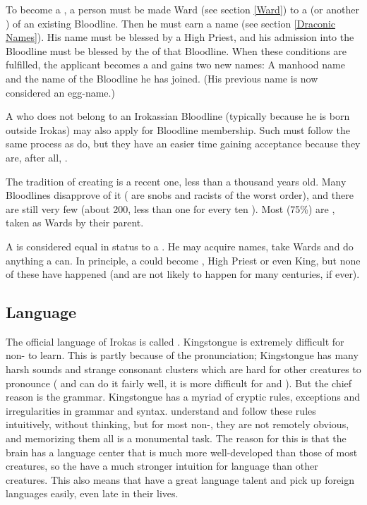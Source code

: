 To become a \dragonbrother{}, a person must be made Ward (see section \ref{Ward}) to a \dragon{} (or another \dragonbrother{}) of an existing Bloodline. Then he must earn a name (see section \ref{Draconic Names}). His name must be blessed by a High Priest, and his admission into the Bloodline must be blessed by the \dragonlord{} of that Bloodline. When these conditions are fulfilled, the applicant becomes a \dragonbrother{} and gains two new names: A manhood name and the name of the Bloodline he has joined. (His previous name is now considered an egg-name.) 

A \dragon{} who does not belong to an Irokassian Bloodline (typically because he is born outside Irokas) may also apply for Bloodline membership. Such \dragons{} must follow the same process as \dragonbrothers{} do, but they have an easier time gaining acceptance because they are, after all, \dragons{}. 

The tradition of creating \dragonbrothers{} is a recent one, less than a thousand years old. Many Bloodlines disapprove of it (\dragons{} are snobs and racists of the worst order), and there are still very few \dragonbrothers{} (about 200, less than one for every ten \dragons{}). Most \dragonbrothers{} (75\%) are \rachyth, taken as Wards by their \draconic{} parent. 

A \dragonbrother{} is considered equal in status to a \dragon{}. He may acquire names, take Wards and do anything a \dragon{} can. In principle, a \dragonbrother{} could become \dragonlord{}, High Priest or even King, but none of these have happened (and are not likely to happen for many centuries, if ever). 



\subsection{Language}
The official language of Irokas is called . Kingstongue is extremely difficult for non-\dragons{} to learn. This is partly because of the pronunciation; Kingstongue has many harsh sounds and strange consonant clusters which are hard for other creatures to pronounce (\scathae{} and \nagae{} can do it fairly well, it is more difficult for \meccara{} and \humans). But the chief reason is the grammar. Kingstongue has a myriad of cryptic rules, exceptions and irregularities in grammar and syntax. \Dragons{} understand and follow these rules intuitively, without thinking, but for most non-\dragons{}, they are not remotely obvious, and memorizing them all is a monumental task. The reason for this is that the \draconic{} brain has a language center that is much more well-developed than those of most creatures, so the \dragons{} have a much stronger intuition for language than other creatures. This also means that \dragons{} have a great language talent and pick up foreign languages easily, even late in their lives. 

